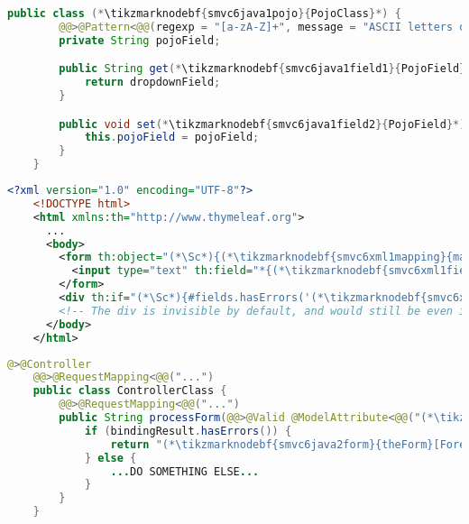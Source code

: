 \enlargethispage{10mm}
\thispagestyle{empty}
\begin{lstlisting}[language=Java, title={POJO class with restricted String field}]
    public class (*\tikzmarknodebf{smvc6java1pojo}{PojoClass}*) {
        @@>@Pattern<@@(regexp = "[a-zA-Z]+", message = "ASCII letters only")
        private String pojoField;

        public String get(*\tikzmarknodebf{smvc6java1field1}{PojoField}*)() {
            return dropdownField;
        }

        public void set(*\tikzmarknodebf{smvc6java1field2}{PojoField}*)(String pojoField) {
            this.pojoField = pojoField;
        }
    }
\end{lstlisting}
\begin{lstlisting}[language=XML, title={HTML form \tikzmarknodebf{smvc6xml1form}{\textit{theForm}}\textit{.html} setting the field}]
    <?xml version="1.0" encoding="UTF-8"?>
    <!DOCTYPE html>
    <html xmlns:th="http://www.thymeleaf.org">
      ...
      <body>
        <form th:object="(*\Sc*){(*\tikzmarknodebf{smvc6xml1mapping}{mappingId}[ForestGreen]*)}" ...>
          <input type="text" th:field="*{(*\tikzmarknodebf{smvc6xml1field1}{pojoField}[ForestGreen]*)}">
        </form>
        <div th:if="(*\Sc*){#fields.hasErrors('(*\tikzmarknodebf{smvc6xml1field2}{pojoField}[ForestGreen]*)')}" th:errors="*{(*\tikzmarknodebf{smvc6xml1field3}{pojoField}[ForestGreen]*)}"/>
        <!-- The div is invisible by default, and would still be even if it had some content -->
      </body>
    </html>
\end{lstlisting}
\begin{lstlisting}[language=Java, title={Controller processing the form}]
    @>@Controller
    @@>@RequestMapping<@@("...")
    public class ControllerClass {
        @@>@RequestMapping<@@("...")
        public String processForm(@@>@Valid @ModelAttribute<@@("(*\tikzmarknodebf{smvc6java2mapping}{mappingId}[ForestGreen]*)") (*\tikzmarknodebf{smvc6java2pojo}{PojoClass}*) pojo, BindingResult bindingResult) {
            if (bindingResult.hasErrors()) {
                return "(*\tikzmarknodebf{smvc6java2form}{theForm}[ForestGreen]*)";
            } else {
                ...DO SOMETHING ELSE...
            }
        }
    }
\end{lstlisting}
\newpage

